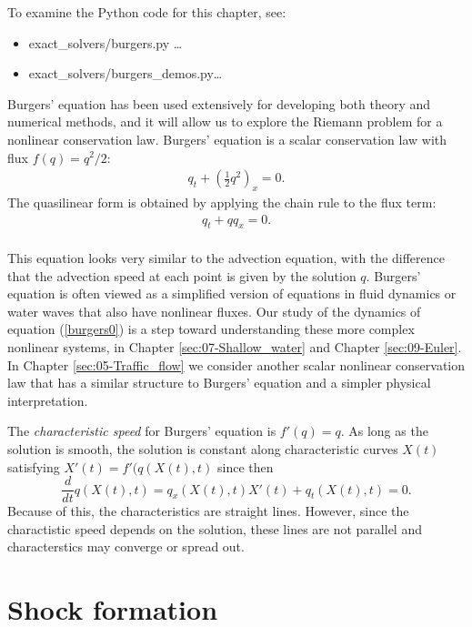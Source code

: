 \documentclass{SIAMbook2016}
\providecommand{\tightlist}{%
      \setlength{\itemsep}{0pt}\setlength{\parskip}{0pt}}
\begin{document}
To examine the Python code for this chapter, see:

\begin{itemize}
\tightlist
\item
  {exact\_solvers/burgers.py} \ldots{}
\item
  {exact\_solvers/burgers\_demos.py}\ldots{}
\end{itemize}

Burgers' equation has been used extensively for developing both theory
and numerical methods, and it will allow us to explore the Riemann
problem for a nonlinear conservation law. Burgers' equation is a scalar
conservation law with flux \(f(q)=q^2/2\): \begin{align}
q_t + \left(\frac{1}{2}q^2\right)_x = 0.
\label{burgers0}
\end{align} The quasilinear form is obtained by applying the chain rule
to the flux term:\\
\begin{align*}
q_t + qq_x = 0.
\end{align*}\\
This equation looks very similar to the advection equation, with the
difference that the advection speed at each point is given by the
solution \(q\). Burgers' equation is often viewed as a simplified
version of equations in fluid dynamics or water waves that also have
nonlinear fluxes. Our study of the dynamics of equation (\ref{burgers0})
is a step toward understanding these more complex nonlinear systems, in
Chapter \ref{sec:07-Shallow_water} and Chapter \ref{sec:09-Euler}. In
Chapter \ref{sec:05-Traffic_flow} we consider another scalar nonlinear
conservation law that has a similar structure to Burgers' equation and a
simpler physical interpretation.

The \emph{characteristic speed} for Burgers' equation is \(f'(q) = q\).
As long as the solution is smooth, the solution is constant along
characteristic curves \(X(t)\) satisfying \(X'(t) = f'(q(X(t),t)\) since
then \[
\frac{d}{dt} q(X(t),t) = q_x(X(t),t)X'(t) + q_t(X(t),t) = 0.
\] Because of this, the characteristics are straight lines. However,
since the charactistic speed depends on the solution, these lines are
not parallel and characterstics may converge or spread out.

\hypertarget{shock-formation}{%
\section{Shock formation}\label{shock-formation}}
\end{document}
